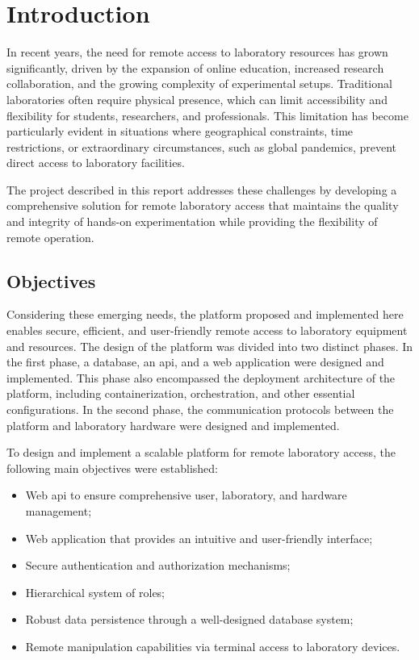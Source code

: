 %
%
\chapter{Introduction}\label{cap:intro}
\let\cleardoublepage\clearpage
In recent years, the need for remote access to laboratory resources has grown significantly, driven by the expansion of online education, increased research collaboration, and the growing complexity of experimental setups. Traditional laboratories often require physical presence, which can limit accessibility and flexibility for students, researchers, and professionals. This limitation has become particularly evident in situations where geographical constraints, time restrictions, or extraordinary circumstances, such as global pandemics, prevent direct access to laboratory facilities.

The project described in this report addresses these challenges by developing a comprehensive solution for remote laboratory access that maintains the quality and integrity of hands-on experimentation while providing the flexibility of remote operation.

%
%
\section{Objectives}\label{sec:objectives}
Considering these emerging needs, the platform proposed and implemented here enables secure, efficient, and user-friendly remote access to laboratory equipment and resources. The design of the platform was divided into two distinct phases. In the first phase, a database, an \acf{api}, and a web application were designed and implemented. This phase also encompassed the deployment architecture of the platform, including containerization, orchestration, and other essential configurations. In the second phase, the communication protocols between the platform and laboratory hardware were designed and implemented.

To design and implement a scalable platform for remote laboratory access, the following main objectives were established:
\begin{itemize}
\item Web \ac{api} to ensure comprehensive user, laboratory, and hardware management;
\item Web application that provides an intuitive and user-friendly interface;
\item Secure authentication and authorization mechanisms;
\item Hierarchical system of roles;
\item Robust data persistence through a well-designed database system;
\item Remote manipulation capabilities via terminal access to laboratory devices.
\end{itemize}

